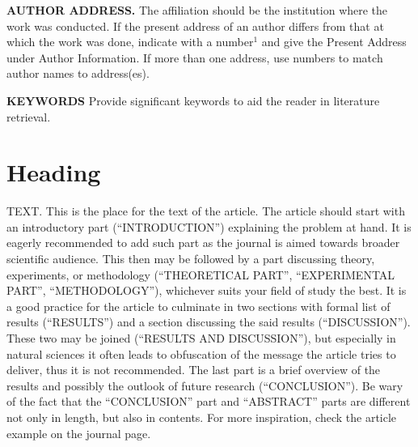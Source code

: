 \documentclass[english]{jasb}
\begin{document}
\textbf{AUTHOR ADDRESS.} The affiliation should be the institution where the work was conducted. If the present address of an author differs from that at which the work was done, indicate with a number$^1$ and give the Present Address under Author Information.  If more than one address, use numbers to match author names to address(es).

\textbf{KEYWORDS} Provide significant keywords to aid the reader in literature retrieval.

\begin{abstract}
    All manuscripts must be accompanied by an abstract. The abstract should briefly state the problem or purpose of the research, indicate the theoretical or experimental plan used, summarize the principal findings, and point out the major conclusions. Abstract length is one paragraph. Be brief and clear.
\end{abstract}

\section{Heading}
TEXT. This is the place for the text of the article. The article should start with an introductory part (``INTRODUCTION'') explaining the problem at hand. It is eagerly recommended to add such part as the journal is aimed towards broader scientific audience. This then may be followed by a part discussing theory, experiments, or methodology (``THEORETICAL PART'', ``EXPERIMENTAL PART'', ``METHODOLOGY''), whichever suits your field of study the best. It is a good practice for the article to culminate in two sections with formal list of results (``RESULTS'') and a section discussing the said results (``DISCUSSION''). These two may be joined (``RESULTS AND DISCUSSION''), but especially in natural sciences it often leads to obfuscation of the message the article tries to deliver, thus it is not recommended. The last part is a brief overview of the results and possibly the outlook of future research (``CONCLUSION''). Be wary of the fact that the ``CONCLUSION'' part and ``ABSTRACT'' parts are different not only in length, but also in contents. For more inspiration, check the article example on the journal page.
\end{document}
